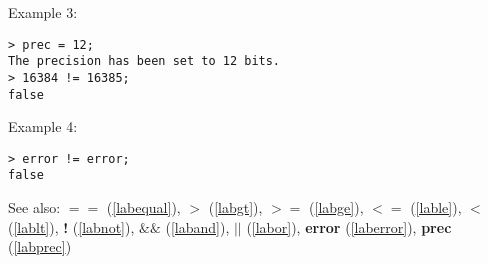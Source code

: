 \noindent Example 3: 
\begin{center}\begin{minipage}{15cm}\begin{Verbatim}[frame=single]
> prec = 12;
The precision has been set to 12 bits.
> 16384 != 16385;
false
\end{Verbatim}
\end{minipage}\end{center}
\noindent Example 4: 
\begin{center}\begin{minipage}{15cm}\begin{Verbatim}[frame=single]
> error != error;
false
\end{Verbatim}
\end{minipage}\end{center}
See also: \textbf{$==$} (\ref{labequal}), \textbf{$>$} (\ref{labgt}), \textbf{$>=$} (\ref{labge}), \textbf{$<=$} (\ref{lable}), \textbf{$<$} (\ref{lablt}), \textbf{!} (\ref{labnot}), \textbf{$\&\&$} (\ref{laband}), \textbf{$||$} (\ref{labor}), \textbf{error} (\ref{laberror}), \textbf{prec} (\ref{labprec})
